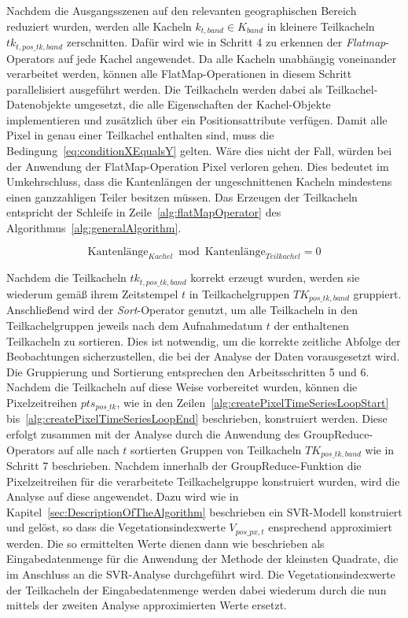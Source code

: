 Nachdem die Ausgangsszenen auf den relevanten geographischen Bereich reduziert wurden, werden alle Kacheln $k_{t, band} \in K_{band}$ in kleinere Teilkacheln $tk_{t, pos\_tk, band}$ zerschnitten. Dafür wird wie in Schritt 4 zu erkennen der \textit{Flatmap}-Operators auf jede Kachel angewendet. Da alle Kacheln unabhängig voneinander verarbeitet werden, können alle FlatMap-Operationen in diesem Schritt parallelisiert ausgeführt werden. Die Teilkacheln werden dabei als Teilkachel-Datenobjekte umgesetzt, die alle Eigenschaften der Kachel-Objekte implementieren und zusätzlich über ein Positionsattribute verfügen. Damit alle Pixel in genau einer Teilkachel enthalten sind, muss die Bedingung~\ref{eq:conditionXEqualsY} gelten. Wäre dies nicht der Fall, würden bei der Anwendung der FlatMap-Operation Pixel verloren gehen. Dies bedeutet im Umkehrschluss, dass die Kantenlängen der ungeschnittenen Kacheln mindestens einen ganzzahligen Teiler besitzen müssen. Das Erzeugen der Teilkacheln entspricht der Schleife in Zeile~\ref{alg:flatMapOperator} des Algorithmus~\ref{alg:generalAlgorithm}.

\begin{equation} \label{eq:conditionXEqualsY}
\text{Kantenlänge}_{Kachel} \bmod \text{Kantenlänge}_{Teilkachel} = 0
\end{equation}
 
Nachdem die Teilkacheln $tk_{t, pos\_tk, band}$ korrekt erzeugt wurden, werden sie wiederum gemäß ihrem Zeitstempel $t$ in Teilkachelgruppen $TK_{pos\_tk, band}$ gruppiert. Anschließend wird der \textit{Sort}-Operator genutzt, um alle Teilkacheln in den Teilkachelgruppen jeweils nach dem Aufnahmedatum $t$ der enthaltenen Teilkacheln zu sortieren. Dies ist notwendig, um die korrekte zeitliche Abfolge der Beobachtungen sicherzustellen, die bei der Analyse der Daten vorausgesetzt wird. Die Gruppierung und Sortierung entsprechen den Arbeitsschritten 5 und 6.
Nachdem die Teilkacheln auf diese Weise vorbereitet wurden, können die Pixelzeitreihen $pts_{pos\_tk}$, wie in den Zeilen~\ref{alg:createPixelTimeSeriesLoopStart} bis~\ref{alg:createPixelTimeSeriesLoopEnd} beschrieben, konstruiert werden. 
Diese erfolgt zusammen mit der Analyse durch die Anwendung des GroupReduce-Operators auf alle nach $t$ sortierten Gruppen von Teilkacheln $TK_{pos\_tk, band}$ wie in Schritt 7 beschrieben. Nachdem innerhalb der GroupReduce-Funktion die Pixelzeitreihen für die verarbeitete Teilkachelgruppe konstruiert wurden, wird die Analyse auf diese angewendet. Dazu wird wie in Kapitel~\ref{sec:DescriptionOfTheAlgorithm} beschrieben ein SVR-Modell konstruiert und gelöst, so dass die Vegetationsindexwerte $V_{pos\_px, t}$ ensprechend approximiert werden. Die so ermittelten Werte dienen dann wie beschrieben als Eingabedatenmenge für die Anwendung der Methode der kleinsten Quadrate, die im Anschluss an die SVR-Analyse durchgeführt wird. Die Vegetationsindexwerte der Teilkacheln der Eingabedatenmenge werden dabei wiederum durch die nun mittels der zweiten Analyse approximierten Werte ersetzt.

